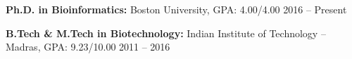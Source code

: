 \documentclass[10pt]{developercv} %
\begin{document}
\vspace{-0.8cm}


%
%
%


\vspace{12pt}

\begin{minipage}[t]{\textwidth}
	\vspace{-\baselineskip} %
\textbf{Ph.D. in Bioinformatics:} Boston University, GPA: 4.00/4.00 \hfill 2016 -- Present

\vspace{1mm}

\textbf{B.Tech \& M.Tech in Biotechnology:} Indian Institute of Technology -- Madras, GPA: 9.23/10.00 \hfill 2011 -- 2016

\end{minipage}\\
\end{document}
